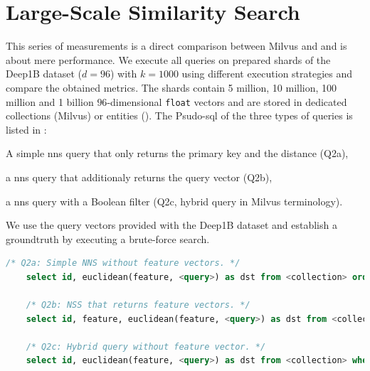 \section{Large-Scale Similarity Search}
This series of measurements is a direct comparison between Milvus and \cottontail{} and is about mere performance. We execute all queries on prepared shards of the Deep1B \cite{Babenko:2016Efficient} dataset ($d=96$) with $k=1000$ using different execution strategies and compare the obtained metrics. The shards contain 5 million, 10 million, 100 million and 1 billion $96$-dimensional \texttt{float} vectors and are stored in dedicated collections (Milvus) or entities (\cottontail). The Psudo-\acrshort{sql} of the three types of queries is listed in :
\begin{enumerate*}[label=(\roman*)]
    \item A simple \acrshort{nns} query that only returns the primary key and the distance (Q2a),
    \item a \acrshort{nns} query that additionaly returns the query vector (Q2b),
    \item a \acrshort{nns} query with a Boolean filter (Q2c, hybrid query in Milvus terminology).
\end{enumerate*} We use the query vectors provided with the Deep1B dataset and establish a groundtruth by executing a brute-force search.

\begin{lstlisting}[language=SQL, caption={Pseudo-SQL of the queries executed for this measurement.}, label=listing:big_nns_query, numbers=none]
    /* Q2a: Simple NNS without feature vectors. */
    select id, euclidean(feature, <query>) as dst from <collection> order by dst limit 1000
    
    /* Q2b: NSS that returns feature vectors. */
    select id, feature, euclidean(feature, <query>) as dst from <collection> order by dst limit 1000

    /* Q2c: Hybrid query without feature vector. */
    select id, euclidean(feature, <query>) as dst from <collection> where category = <category> order by dst limit 1000
\end{lstlisting}

